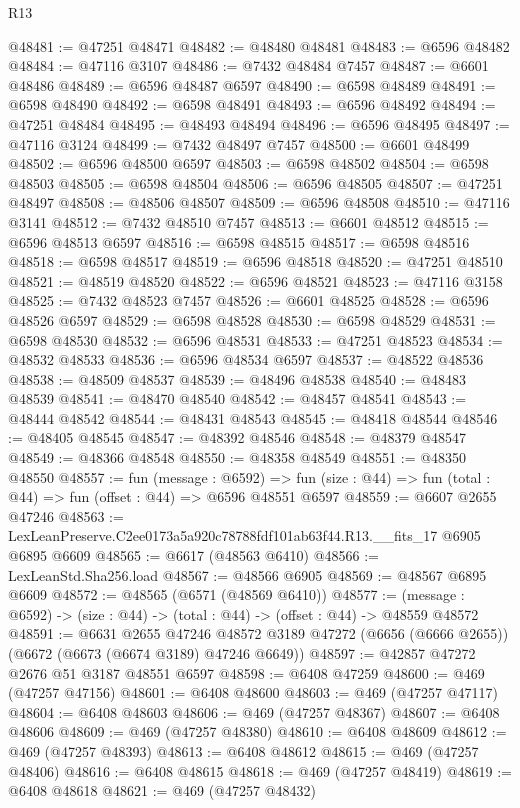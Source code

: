 \begin{lexlean}{R13}
\begin{coremodule}
@48481 := @47251 @48471
@48482 := @48480 @48481
@48483 := @6596 @48482
@48484 := @47116 @3107
@48486 := @7432 @48484 @7457
@48487 := @6601 @48486
@48489 := @6596 @48487 @6597
@48490 := @6598 @48489
@48491 := @6598 @48490
@48492 := @6598 @48491
@48493 := @6596 @48492
@48494 := @47251 @48484
@48495 := @48493 @48494
@48496 := @6596 @48495
@48497 := @47116 @3124
@48499 := @7432 @48497 @7457
@48500 := @6601 @48499
@48502 := @6596 @48500 @6597
@48503 := @6598 @48502
@48504 := @6598 @48503
@48505 := @6598 @48504
@48506 := @6596 @48505
@48507 := @47251 @48497
@48508 := @48506 @48507
@48509 := @6596 @48508
@48510 := @47116 @3141
@48512 := @7432 @48510 @7457
@48513 := @6601 @48512
@48515 := @6596 @48513 @6597
@48516 := @6598 @48515
@48517 := @6598 @48516
@48518 := @6598 @48517
@48519 := @6596 @48518
@48520 := @47251 @48510
@48521 := @48519 @48520
@48522 := @6596 @48521
@48523 := @47116 @3158
@48525 := @7432 @48523 @7457
@48526 := @6601 @48525
@48528 := @6596 @48526 @6597
@48529 := @6598 @48528
@48530 := @6598 @48529
@48531 := @6598 @48530
@48532 := @6596 @48531
@48533 := @47251 @48523
@48534 := @48532 @48533
@48536 := @6596 @48534 @6597
@48537 := @48522 @48536
@48538 := @48509 @48537
@48539 := @48496 @48538
@48540 := @48483 @48539
@48541 := @48470 @48540
@48542 := @48457 @48541
@48543 := @48444 @48542
@48544 := @48431 @48543
@48545 := @48418 @48544
@48546 := @48405 @48545
@48547 := @48392 @48546
@48548 := @48379 @48547
@48549 := @48366 @48548
@48550 := @48358 @48549
@48551 := @48350 @48550
@48557 := fun (message : @6592) =>
  fun (size : @44) => fun (total : @44) => fun (offset : @44) => @6596 @48551 @6597
@48559 := @6607 @2655 @47246
@48563 := LexLeanPreserve.C2ee0173a5a920c78788fdf101ab63f44.R13.__fits_17 @6905 @6895 @6609
@48565 := @6617 (@48563 @6410)
@48566 := LexLeanStd.Sha256.load
@48567 := @48566 @6905
@48569 := @48567 @6895 @6609
@48572 := @48565 (@6571 (@48569 @6410))
@48577 := (message : @6592) -> (size : @44) -> (total : @44) -> (offset : @44) -> @48559 @48572
@48591 := @6631
    @2655
    @47246
    @48572
    @3189
    @47272
    (@6656 (@6666 @2655))
    (@6672 (@6673 (@6674 @3189) @47246 @6649))
@48597 := @42857 @47272 @2676 @51 @3187 @48551 @6597
@48598 := @6408 @47259
@48600 := @469 (@47257 @47156)
@48601 := @6408 @48600
@48603 := @469 (@47257 @47117)
@48604 := @6408 @48603
@48606 := @469 (@47257 @48367)
@48607 := @6408 @48606
@48609 := @469 (@47257 @48380)
@48610 := @6408 @48609
@48612 := @469 (@47257 @48393)
@48613 := @6408 @48612
@48615 := @469 (@47257 @48406)
@48616 := @6408 @48615
@48618 := @469 (@47257 @48419)
@48619 := @6408 @48618
@48621 := @469 (@47257 @48432)

\end{coremodule}
\end{lexlean}

